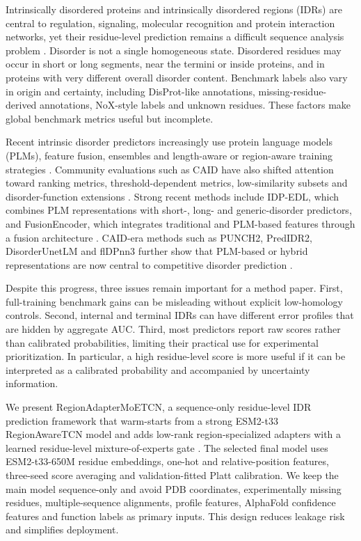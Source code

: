\documentclass[namedate,webpdf,traditional,large]{oup-authoring-template}
\newcommand{\method}{RegionAdapterMoETCN}
\newcommand{\backbone}{RegionAwareTCN}
\begin{document}
Intrinsically disordered proteins and intrinsically disordered regions (IDRs) are central to regulation, signaling, molecular recognition and protein interaction networks, yet their residue-level prediction remains a difficult sequence analysis problem \citep{wright1999intrinsically,necci2021caid}. Disorder is not a single homogeneous state. Disordered residues may occur in short or long segments, near the termini or inside proteins, and in proteins with very different overall disorder content. Benchmark labels also vary in origin and certainty, including DisProt-like annotations, missing-residue-derived annotations, NoX-style labels and unknown residues. These factors make global benchmark metrics useful but incomplete.

Recent intrinsic disorder predictors increasingly use protein language models (PLMs), feature fusion, ensembles and length-aware or region-aware training strategies \citep{tang2023idpfusion,pang2023idplm,nambiar2024drbert,xie2025idpedl,liu2025fusionencoder}. Community evaluations such as CAID have also shifted attention toward ranking metrics, threshold-dependent metrics, low-similarity subsets and disorder-function extensions \citep{necci2021caid,caid3_2026,pang2024disoflag}. Strong recent methods include IDP-EDL, which combines PLM representations with short-, long- and generic-disorder predictors, and FusionEncoder, which integrates traditional and PLM-based features through a fusion architecture \citep{xie2025idpedl,liu2025fusionencoder}. CAID-era methods such as PUNCH2, PredIDR2, DisorderUnetLM and flDPnn3 further show that PLM-based or hybrid representations are now central to competitive disorder prediction \citep{meng2025punch2,han2025predidr2,kotowski2025disorderunetlm,wang2026fldpnn3}.

Despite this progress, three issues remain important for a method paper. First, full-training benchmark gains can be misleading without explicit low-homology controls. Second, internal and terminal IDRs can have different error profiles that are hidden by aggregate AUC. Third, most predictors report raw scores rather than calibrated probabilities, limiting their practical use for experimental prioritization. In particular, a high residue-level score is more useful if it can be interpreted as a calibrated probability and accompanied by uncertainty information.

We present \method, a sequence-only residue-level IDR prediction framework that warm-starts from a strong ESM2-t33 \backbone{} model and adds low-rank region-specialized adapters with a learned residue-level mixture-of-experts gate \citep{lin2023esm,platt1999probabilistic}. The selected final model uses ESM2-t33-650M residue embeddings, one-hot and relative-position features, three-seed score averaging and validation-fitted Platt calibration. We keep the main model sequence-only and avoid PDB coordinates, experimentally missing residues, multiple-sequence alignments, profile features, AlphaFold confidence features and function labels as primary inputs. This design reduces leakage risk and simplifies deployment.
\end{document}
